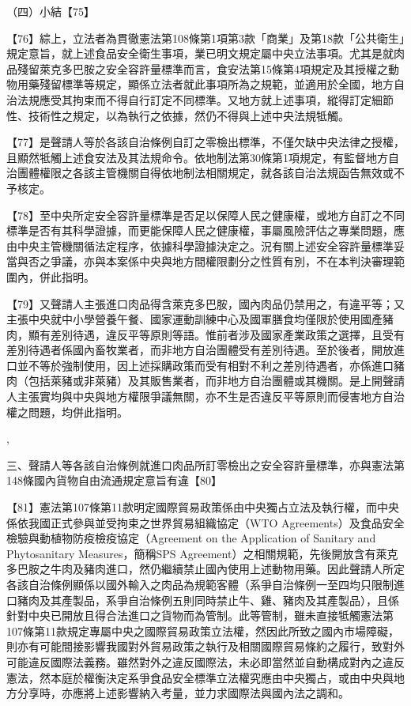 \documentclass{ctexart} %
\begin{document}
{（四）小結【75】

【76】綜上，立法者為貫徹憲法第108條第1項第3款「商業」及第18款「公共衛生」規定意旨，就上述食品安全衛生事項，業已明文規定屬中央立法事項。尤其是就肉品殘留萊克多巴胺之安全容許量標準而言，食安法第15條第4項規定及其授權之動物用藥殘留標準等規定，顯係立法者就此事項所為之規範，並適用於全國，地方自治法規應受其拘束而不得自行訂定不同標準。又地方就上述事項，縱得訂定細節性、技術性之規定，以為執行之依據，然仍不得與上述中央法規牴觸。

【77】是聲請人等於各該自治條例自訂之零檢出標準，不僅欠缺中央法律之授權，且顯然牴觸上述食安法及其法規命令。依地制法第30條第1項規定，有監督地方自治團體權限之各該主管機關自得依地制法相關規定，就各該自治法規函告無效或不予核定。

【78】至中央所定安全容許量標準是否足以保障人民之健康權，或地方自訂之不同標準是否有其科學證據，而更能保障人民之健康權，事屬風險評估之專業問題，應由中央主管機關循法定程序，依據科學證據決定之。況有關上述安全容許量標準妥當與否之爭議，亦與本案係中央與地方間權限劃分之性質有別，不在本判決審理範圍內，併此指明。

【79】又聲請人主張進口肉品得含萊克多巴胺，國內肉品仍禁用之，有違平等；又主張中央就中小學營養午餐、國家運動訓練中心及國軍膳食均僅限於使用國產豬肉，顯有差別待遇，違反平等原則等語。惟前者涉及國家產業政策之選擇，且受有差別待遇者係國內畜牧業者，而非地方自治團體受有差別待遇。至於後者，開放進口並不等於強制使用，因上述採購政策而受有相對不利之差別待遇者，亦係進口豬肉（包括萊豬或非萊豬）及其販售業者，而非地方自治團體或其機關。是上開聲請人主張實均與中央與地方權限爭議無關，亦不生是否違反平等原則而侵害地方自治權之問題，均併此指明。

\sep


三、聲請人等各該自治條例就進口肉品所訂零檢出之安全容許量標準，亦與憲法第148條國內貨物自由流通規定意旨有違【80】

【81】憲法第107條第11款明定國際貿易政策係由中央獨占立法及執行權，而中央係依我國正式參與並受拘束之世界貿易組織協定（WTO Agreements）及食品安全檢驗與動植物防疫檢疫協定（Agreement on the Application of Sanitary and Phytosanitary Measures，簡稱SPS Agreement）之相關規範，先後開放含有萊克多巴胺之牛肉及豬肉進口，然仍繼續禁止國內使用上述動物用藥。因此聲請人所定各該自治條例顯係以國外輸入之肉品為規範客體（系爭自治條例一至四均只限制進口豬肉及其產製品，系爭自治條例五則同時禁止牛、雞、豬肉及其產製品），且係針對中央已開放且得合法進口之貨物而為管制。此等管制，雖未直接牴觸憲法第107條第11款規定專屬中央之國際貿易政策立法權，然因此所致之國內市場障礙，則亦有可能間接影響我國對外貿易政策之執行及相關國際貿易條約之履行，致對外可能違反國際法義務。雖然對外之違反國際法，未必即當然並自動構成對內之違反憲法，然本庭於權衡決定系爭食品安全標準立法權究應由中央獨占，或由中央與地方分享時，亦應將上述影響納入考量，並力求國際法與國內法之調和。

}
\end{document}

